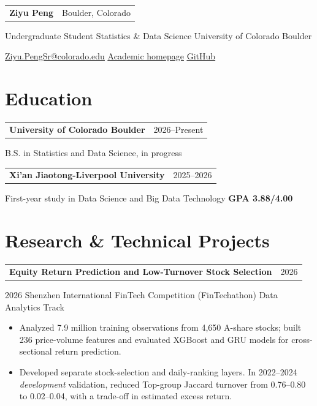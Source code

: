 \documentclass[10pt,letterpaper]{article}
\makeatletter
\newcommand{\entry}[2]{%
  \begin{tabularx}{\textwidth}{@{}>{\raggedright\arraybackslash}X@{\hspace{12pt}}r@{}}
    \textbf{#1} & {\fontsize{9.5}{11.5}\selectfont\color{muted}#2}
  \end{tabularx}}
\newcommand{\detail}[1]{%
  {\fontsize{9.5}{11.8}\selectfont\color{muted}#1\par}}
\newcommand{\cvlink}[2]{\href{#1}{\underline{#2}}}
\makeatother
\begin{document}
\color{ink}
\fontsize{10}{12.2}\selectfont

\begin{tabularx}{\textwidth}{@{}Xr@{}}
  {\rmfamily\fontsize{29}{32}\selectfont\bfseries Ziyu Peng}
  & {\fontsize{9.5}{11.5}\selectfont\color{muted}Boulder, Colorado}
\end{tabularx}
\vspace{5pt}

{\fontsize{9.5}{11.5}\selectfont
Undergraduate Student \textperiodcentered{} Statistics \& Data Science \textperiodcentered{} University of Colorado Boulder\par}
\vspace{5pt}
{\fontsize{9.5}{11.5}\selectfont
\cvlink{mailto:Ziyu.PengSr@colorado.edu}{Ziyu.PengSr@colorado.edu}
\hspace{14pt}
\cvlink{https://pzy54154631-hub.github.io/homepage/}{Academic homepage}
\hspace{14pt}
\cvlink{https://github.com/pzy54154631-hub}{GitHub}\par}

\section*{Education}
\entry{University of Colorado Boulder}{2026--Present}
\detail{B.S. in Statistics and Data Science, in progress}
\vspace{6pt}
\entry{Xi'an Jiaotong-Liverpool University}{2025--2026}
\detail{First-year study in Data Science and Big Data Technology \textperiodcentered{} \textbf{GPA 3.88/4.00}}

\section*{Research \& Technical Projects}
\entry{Equity Return Prediction and Low-Turnover Stock Selection}{2026}
\detail{2026 Shenzhen International FinTech Competition (FinTechathon) \textperiodcentered{} Data Analytics Track}
\begin{itemize}
  \item Analyzed 7.9 million training observations from 4,650 A-share stocks; built 236 price-volume features and evaluated XGBoost and GRU models for cross-sectional return prediction.
  \item Developed separate stock-selection and daily-ranking layers. In 2022--2024 \emph{development} validation, reduced Top-group Jaccard turnover from 0.76--0.80 to 0.02--0.04, with a trade-off in estimated excess return.
\end{itemize}
\end{document}
